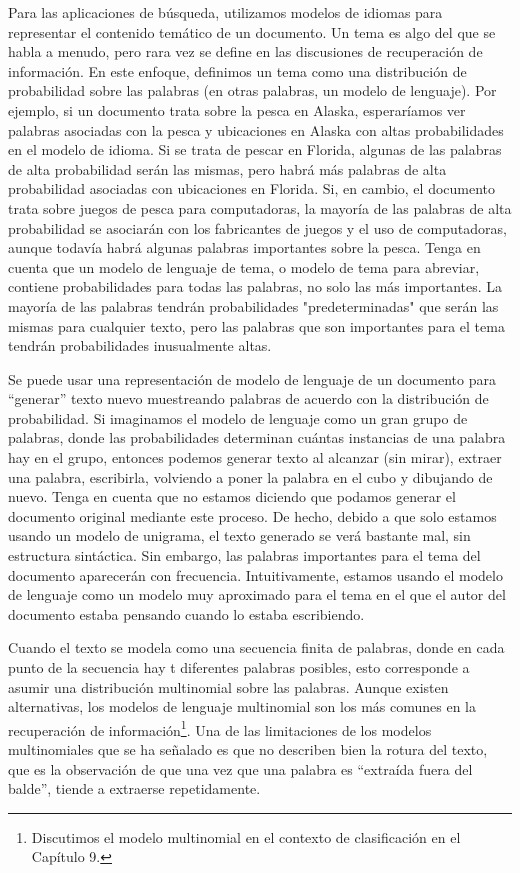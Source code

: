 Para las aplicaciones de búsqueda, utilizamos modelos de idiomas para representar el contenido temático de un documento. Un tema es algo del que se habla a menudo, pero rara vez se define en las discusiones de recuperación de información. En este enfoque, definimos un tema como una distribución de probabilidad sobre las palabras (en otras palabras, un modelo de lenguaje). Por ejemplo, si un documento trata sobre la pesca en Alaska, esperaríamos ver palabras asociadas con la pesca y ubicaciones en Alaska con altas probabilidades en el modelo de idioma. Si se trata de pescar en Florida, algunas de las palabras de alta probabilidad serán las mismas, pero habrá más palabras de alta probabilidad asociadas con ubicaciones en Florida. Si, en cambio, el documento trata sobre juegos de pesca para computadoras, la mayoría de las palabras de alta probabilidad se asociarán con los fabricantes de juegos y el uso de computadoras, aunque todavía habrá algunas palabras importantes sobre la pesca. Tenga en cuenta que un modelo de lenguaje de tema, o modelo de tema para abreviar, contiene probabilidades para todas las palabras, no solo las más importantes. La mayoría de las palabras tendrán probabilidades "predeterminadas" que serán las mismas para cualquier texto, pero las palabras que son importantes para el tema tendrán probabilidades inusualmente altas.

Se puede usar una representación de modelo de lenguaje de un documento para ``generar'' texto nuevo muestreando palabras de acuerdo con la distribución de probabilidad. Si imaginamos el modelo de lenguaje como un gran grupo de palabras, donde las probabilidades determinan cuántas instancias de una palabra hay en el grupo, entonces podemos generar texto al alcanzar (sin mirar), extraer una palabra, escribirla, volviendo a poner la palabra en el cubo y dibujando de nuevo. Tenga en cuenta que no estamos diciendo que podamos generar el documento original mediante este proceso. De hecho, debido a que solo estamos usando un modelo de unigrama, el texto generado se verá bastante mal, sin estructura sintáctica. Sin embargo, las palabras importantes para el tema del documento aparecerán con frecuencia. Intuitivamente, estamos usando el modelo de lenguaje como un modelo muy aproximado para el tema en el que el autor del documento estaba pensando cuando lo estaba escribiendo.

Cuando el texto se modela como una secuencia finita de palabras, donde en cada punto de la secuencia hay t diferentes palabras posibles, esto corresponde a asumir una distribución multinomial sobre las palabras. Aunque existen alternativas, los modelos de lenguaje multinomial son los más comunes en la recuperación de información\footnote{Discutimos el modelo multinomial en el contexto de clasificación en el Capítulo 9.}. Una de las limitaciones de los modelos multinomiales que se ha señalado es que no describen bien la rotura del texto, que es la observación de que una vez que una palabra es ``extraída fuera del balde'', tiende a extraerse repetidamente.


